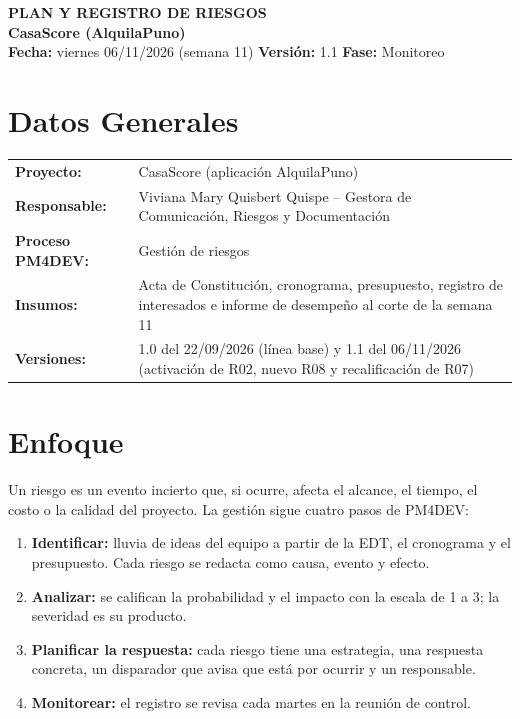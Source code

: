 \documentclass[11pt,a4paper]{article}
\begin{document}
\begin{center}
    {\Large \textbf{\textcolor{AzulUNA}{PLAN Y REGISTRO DE RIESGOS}}}\\[3pt]
    {\normalsize \textbf{CasaScore (AlquilaPuno)}}\\[4pt]
    \footnotesize \textbf{Fecha:} viernes 06/11/2026 (semana 11) \quad \textbar\quad \textbf{Versión:} 1.1 \quad \textbar\quad \textbf{Fase:} Monitoreo
\end{center}

\vspace{0.1cm}

\section{Datos Generales}
\noindent\begin{tabularx}{\textwidth}{@{}P{4.2cm} L@{}}
\toprule
\textbf{Proyecto:} & CasaScore (aplicación AlquilaPuno) \\
\textbf{Responsable:} & Viviana Mary Quisbert Quispe -- Gestora de Comunicación, Riesgos y Documentación \\
\textbf{Proceso PM4DEV:} & Gestión de riesgos \\
\textbf{Insumos:} & Acta de Constitución, cronograma, presupuesto, registro de interesados e informe de desempeño al corte de la semana 11 \\
\textbf{Versiones:} & 1.0 del 22/09/2026 (línea base) y 1.1 del 06/11/2026 (activación de R02, nuevo R08 y recalificación de R07) \\
\bottomrule
\end{tabularx}

\section{Enfoque}
Un riesgo es un evento incierto que, si ocurre, afecta el alcance, el tiempo, el costo o la calidad del proyecto. La gestión sigue cuatro pasos de PM4DEV:
\begin{enumerate}[leftmargin=*]
    \item \textbf{Identificar:} lluvia de ideas del equipo a partir de la EDT, el cronograma y el presupuesto. Cada riesgo se redacta como causa, evento y efecto.
    \item \textbf{Analizar:} se califican la probabilidad y el impacto con la escala de 1 a 3; la severidad es su producto.
    \item \textbf{Planificar la respuesta:} cada riesgo tiene una estrategia, una respuesta concreta, un disparador que avisa que está por ocurrir y un responsable.
    \item \textbf{Monitorear:} el registro se revisa cada martes en la reunión de control.
\end{enumerate}
\end{document}
